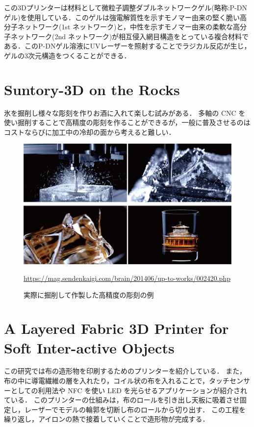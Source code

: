 この3Dプリンターは材料として微粒子調整ダブルネットワークゲル(略称:P-DNゲル)を使用している．このゲルは強電解質性を示すモノマー由来の堅く脆い高分子ネットワーク(1st ネットワーク)と，中性を示すモノマー由来の柔軟な高分子ネットワーク(2nd ネットワーク)が相互侵入網目構造をとっている複合材料である．このP-DNゲル溶液にUVレーザーを照射することでラジカル反応が生じ，ゲルの3次元構造をつくることができる．


\section{Suntory-3D on the Rocks\cite{b}}
\label{sec:enum}

氷を掘削し様々な彫刻を作りお酒に入れて楽しむ試みがある．
多軸の CNC を使い掘削することで高精度の彫刻を作ることができるが，一般に普及させるのはコストならびに加工中の冷却の面から考えると難しい．

\begin{figure}[H]
  \centering
  \includegraphics[width=12truecm]{./fig/Suntory.jpg}
  \caption{実際に掘削して作製した高精度の彫刻の例}
  \url{https://mag.sendenkaigi.com/brain/201406/up-to-works/002420.php} %
  \label{fig:Suntory}
\end{figure}


\section{A Layered Fabric 3D Printer for Soft Inter-active Objects\cite{c}}
\label{sec:enum}
この研究では布の造形物を印刷するためのプリンターを紹介している．
また，布の中に導電繊維の層を入れたり，コイル状の布を入れることで，タッチセンサーとしての利用法や NFC を使い LED を光らせるアプリケーションが紹介されている．
このプリンターの仕組みは，布のロールを引き出し天板に吸着させ固定し，レーザーでモデルの輪郭を切断し布のロールから切り出す．
この工程を繰り返し，アイロンの熱で接着していくことで造形物が完成する．

